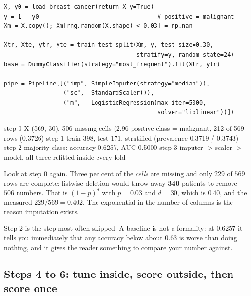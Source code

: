 \documentclass[11pt]{article}
\begin{document}
\begin{lstlisting}
X, y0 = load_breast_cancer(return_X_y=True)
y = 1 - y0                                  # positive = malignant
Xm = X.copy(); Xm[rng.random(X.shape) < 0.03] = np.nan

Xtr, Xte, ytr, yte = train_test_split(Xm, y, test_size=0.30,
                                      stratify=y, random_state=24)
base = DummyClassifier(strategy="most_frequent").fit(Xtr, ytr)

pipe = Pipeline([("imp", SimpleImputer(strategy="median")),
                 ("sc",  StandardScaler()),
                 ("m",   LogisticRegression(max_iter=5000,
                                            solver="liblinear"))])
\end{lstlisting}
\begin{codeout}
step 0  X (569, 30), 506 missing cells (2.96%
        positive class = malignant, 212 of 569 rows (0.3726)
step 1  train 398, test 171, stratified (prevalence 0.3719 / 0.3743)
step 2  majority class: accuracy 0.6257, AUC 0.5000
step 3  imputer -> scaler -> model, all three refitted inside every fold
\end{codeout}

Look at step 0 again. Three per cent of the \emph{cells} are missing and only
$229$ of $569$ rows are complete: listwise deletion would throw away
$\mathbf{340}$ patients to remove $506$ numbers. That is $(1-p)^d$ with
$p = 0.03$ and $d = 30$, which is $0.40$, and the measured $229/569 = 0.402$.
The exponential in the number of columns is the reason imputation exists.

Step 2 is the step most often skipped. A baseline is not a formality: at
$0.6257$ it tells you immediately that any accuracy below about $0.63$ is
worse than doing nothing, and it gives the reader something to compare your
number against.

\subsection{Steps 4 to 6: tune inside, score outside, then score once}
\end{document}
